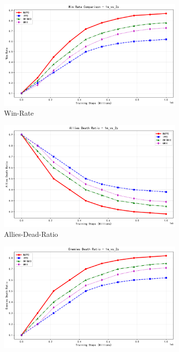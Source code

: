 \begin{figure}[ht!]
    \centering
    \begin{subfigure}[b]{0.32\textwidth}
        \centering
        \includegraphics[width=\textwidth]{figures/win_rate_1m_vs_2z.png}
        \caption{Win-Rate}
        \label{fig:win_rate_2m}
    \end{subfigure}
    \hfill
    \begin{subfigure}[b]{0.32\textwidth}
        \centering
        \includegraphics[width=\textwidth]{figures/allies_death_ratio_1m_vs_2z.png}
        \caption{Allies-Dead-Ratio}
        \label{fig:allies_dead_2m}
    \end{subfigure}
    \hfill
    \begin{subfigure}[b]{0.32\textwidth}
        \centering
        \includegraphics[width=\textwidth]{figures/enemies_death_ratio_1m_vs_2z.png}

\end{subfigure}
\end{figure}
